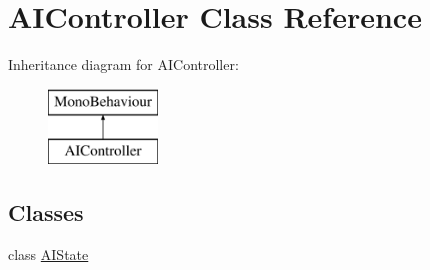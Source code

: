 \hypertarget{class_a_i_controller}{}\section{A\+I\+Controller Class Reference}
\label{class_a_i_controller}
Inheritance diagram for A\+I\+Controller\+:\begin{figure}[H]
\begin{center}
\leavevmode
\includegraphics[height=2.000000cm]{class_a_i_controller}
\end{center}
\end{figure}
\subsection*{Classes}
\begin{DoxyCompactItemize}
\item 
class \hyperlink{class_a_i_controller_1_1_a_i_state}{A\+I\+State}
\end{DoxyCompactItemize}
